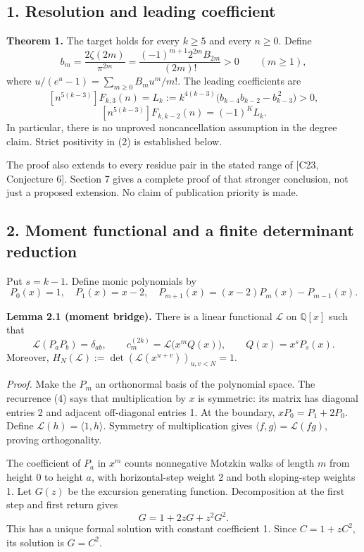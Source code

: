 \documentclass[
  11pt,
]{article}
\begin{document}
\subsection{1. Resolution and leading
coefficient}\label{resolution-and-leading-coefficient}

\textbf{Theorem 1.} The target holds for every \(k\ge5\) and every
\(n\ge0\). Define \[
 b_m=\frac{2\zeta(2m)}{\pi^{2m}}
     =\frac{(-1)^{m+1}2^{2m}B_{2m}}{(2m)!}>0\qquad(m\ge1),
 \tag{1}
\] where \(u/(e^u-1)=\sum_{m\ge0}B_mu^m/m!\). The leading coefficients
are \[
 \boxed{\ [n^{5(k-3)}]F_{k,3}(n)
 =L_k:=k^{4(k-3)}\bigl(b_{k-4}b_{k-2}-b_{k-3}^{\,2}\bigr)>0,\ }
 \tag{2}
\] \[
 \boxed{\ [n^{5(k-3)}]F_{k,k-2}(n)=(-1)^K L_k.\ }
 \tag{3}
\] In particular, there is no unproved noncancellation assumption in the
degree claim. Strict positivity in (2) is established below.

The proof also extends to every residue pair in the stated range of
{[}C23, Conjecture 6{]}. Section 7 gives a complete proof of that
stronger conclusion, not just a proposed extension. No claim of
publication priority is made.

\subsection{2. Moment functional and a finite determinant
reduction}\label{moment-functional-and-a-finite-determinant-reduction}

Put \(s=k-1\). Define monic polynomials by \[
 P_0(x)=1,\quad P_1(x)=x-2,\quad
 P_{m+1}(x)=(x-2)P_m(x)-P_{m-1}(x).
 \tag{4}
\]

\textbf{Lemma 2.1 (moment bridge).} There is a linear functional
\(\mathcal L\) on \(\mathbb Q[x]\) such that \[
 \mathcal L(P_aP_b)=\delta_{ab},\qquad
 c_m^{(2k)}=\mathcal L\bigl(x^m Q(x)\bigr),\qquad
 Q(x)=x^sP_s(x).
 \tag{5}
\] Moreover, \(H_N(\mathcal L):=\det(\mathcal L(x^{u+v}))_{u,v<N}=1\).

\emph{Proof.} Make the \(P_m\) an orthonormal basis of the polynomial
space. The recurrence (4) says that multiplication by \(x\) is
symmetric: its matrix has diagonal entries 2 and adjacent off-diagonal
entries 1. At the boundary, \(xP_0=P_1+2P_0\). Define
\(\mathcal L(h)=\langle1,h\rangle\). Symmetry of multiplication gives
\(\langle f,g\rangle=\mathcal L(fg)\), proving orthogonality.

The coefficient of \(P_a\) in \(x^m\) counts nonnegative Motzkin walks
of length \(m\) from height 0 to height \(a\), with horizontal-step
weight 2 and both sloping-step weights 1. Let \(G(z)\) be the excursion
generating function. Decomposition at the first step and first return
gives \[
 G=1+2zG+z^2G^2.
\] This has a unique formal solution with constant coefficient 1. Since
\(C=1+zC^2\), its solution is \(G=C^2\).
\end{document}
